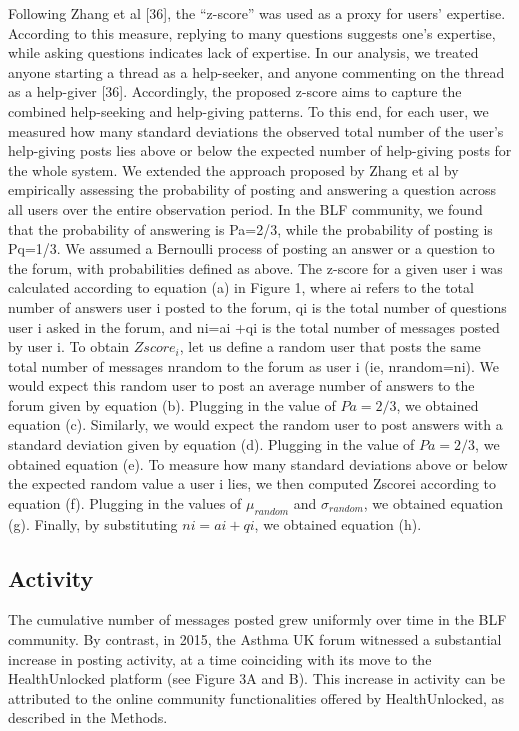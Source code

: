 Following Zhang et al [36], the “z-score” was used as a proxy for users’ expertise. According to this measure, replying to many questions suggests one’s expertise, while asking questions indicates lack of expertise. In our analysis, we treated anyone starting a thread as a help-seeker, and anyone commenting on the thread as a help-giver [36]. Accordingly, the proposed z-score aims to capture the combined help-seeking and help-giving patterns. To this end, for each user, we measured how many standard deviations the observed total number of the user’s help-giving posts lies above or below the expected number of help-giving posts for the whole system. We extended the approach proposed by Zhang et al by empirically assessing the probability of posting and answering a question across all users over the entire observation period. In the BLF community, we found that the probability of answering is Pa=2/3, while the probability of posting is Pq=1/3. We assumed a Bernoulli process of posting an answer or a question to the forum, with probabilities defined as above. The z-score for a given user i was calculated according to equation (a) in Figure 1, where ai refers to the total number of answers user i posted to the forum, qi is the total number of questions user i asked in the forum, and ni=ai +qi is the total number of messages posted by user i.
To obtain $Zscore_i$, let us define a random user that posts the same total number of messages nrandom to the forum as user i (ie, nrandom=ni). We would expect this random user to post an average number of answers to the forum given by equation (b). Plugging in the value of $Pa=2/3$, we obtained equation (c). Similarly, we would expect the random user to post answers with a standard deviation given by equation (d). Plugging in the value of $Pa=2/3$, we obtained equation (e). To measure how many standard deviations above or below the expected random value a user i lies, we then computed Zscorei according to equation (f). Plugging in the values of $\mu_{random}$ and $\sigma_{random}$, we obtained equation (g). Finally, by substituting $ni=ai +qi$, we obtained equation (h). 


\subsection{Activity}

The cumulative number of messages posted grew uniformly over time in the BLF community. By contrast, in 2015, the Asthma UK forum witnessed a substantial increase in posting activity, at a time coinciding with its move to the HealthUnlocked platform (see Figure 3A and B). This increase in activity can be attributed to the online community functionalities offered by HealthUnlocked, as described in the Methods.

